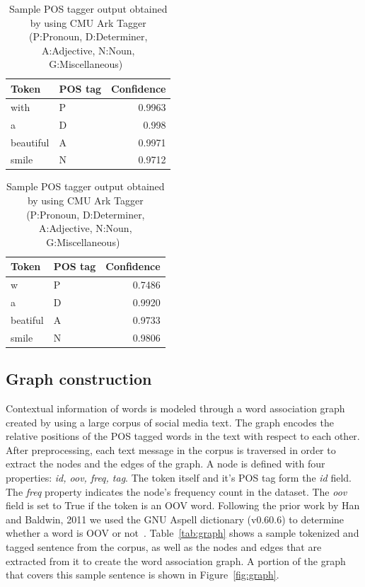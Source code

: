\documentclass[preprint,review,12pt]{elsarticle}
\begin{document}
\begin{table}[htbp]
\begin{minipage}{.5\linewidth}
\begin{tabular}[h]{|llr|}
 \hline
Token & POS tag & Confidence \\
 \hline
with & P & 0.9963 \\
 \hline
a & D & 0.998 \\
 \hline
beautiful & A & 0.9971 \\
 \hline
smile & N & 0.9712 \\
 \hline
\end{tabular}
\end{minipage}
\begin{minipage}{.5\linewidth}
\begin{tabular}[h]{|llr|}
 \hline
Token & POS tag & Confidence \\
 \hline
w & P & 0.7486 \\
 \hline
a & D & 0.9920 \\
 \hline
beatiful & A & 0.9733 \\
 \hline
smile & N & 0.9806 \\
 \hline
\end{tabular}
\end{minipage}
\caption{Sample POS tagger output obtained by using CMU Ark Tagger (P:Pronoun, D:Determiner, A:Adjective, N:Noun, G:Miscellaneous)~\cite{DBLP:conf/naacl/OwoputiODGSS13,Gimpel:2011:PTT:2002736.2002747}}
\label{tab:postags}
\end{table}

\subsection{Graph construction}

Contextual information of words is modeled through a word association graph created by using a large corpus of social media text. The graph encodes the relative positions of the POS tagged words in the text with respect to each other. After preprocessing, each text message in the corpus is traversed in order to extract the nodes and the edges of the graph.
A node is defined with four properties: \textit{id, oov, freq, tag}. The token itself and it's POS tag form the \textit{id} field. The \textit{freq} property indicates the node's frequency count in the dataset. The \textit{oov} field is set to True if the token is an OOV word. Following the prior work by Han and Baldwin, 2011 we used the GNU Aspell dictionary (v0.60.6) to determine whether a word is OOV or not~\cite{Han:2011:LNS:2002472.2002520}. Table~\ref{tab:graph} shows a sample tokenized and tagged sentence from the corpus, as well as the nodes and edges that are extracted from it to create the word association graph. A portion of the graph that covers this sample sentence is shown in Figure~\ref{fig:graph}.
\end{document}

